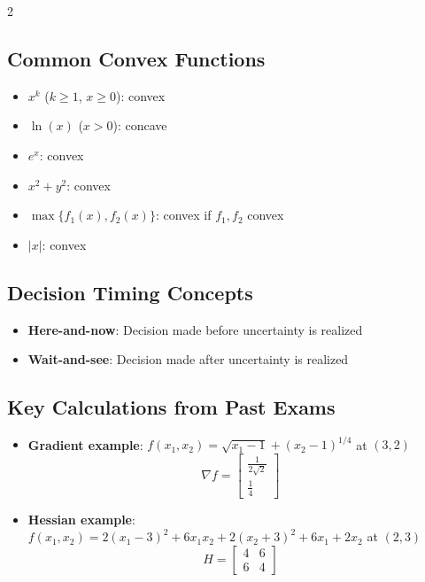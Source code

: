 \documentclass[10pt,a4paper,landscape]{article}
\begin{document}
\begin{multicols}{2}
\subsection*{Common Convex Functions}
\begin{itemize}
\item $x^k$ ($k \geq 1$, $x \geq 0$): convex
\item $\ln(x)$ ($x > 0$): concave
\item $e^x$: convex
\item $x^2 + y^2$: convex
\item $\max\{f_1(x), f_2(x)\}$: convex if $f_1, f_2$ convex
\item $|x|$: convex
\end{itemize}

\subsection*{Decision Timing Concepts}
\begin{itemize}
\item \textbf{Here-and-now}: Decision made before uncertainty is realized
\item \textbf{Wait-and-see}: Decision made after uncertainty is realized
\end{itemize}

\subsection*{Key Calculations from Past Exams}
\begin{itemize}
\item \textbf{Gradient example}: $f(x_1,x_2) = \sqrt{x_1-1} + (x_2-1)^{1/4}$ at $(3,2)$
  \[\nabla f = \begin{bmatrix} \frac{1}{2\sqrt{2}} \\ \frac{1}{4} \end{bmatrix}\]
\item \textbf{Hessian example}: $f(x_1,x_2) = 2(x_1-3)^2 + 6x_1x_2 + 2(x_2+3)^2 + 6x_1 + 2x_2$ at $(2,3)$
  \[H = \begin{bmatrix} 4 & 6 \\ 6 & 4 \end{bmatrix}\]
\end{itemize}

\end{multicols}

\vfill
\end{document}
